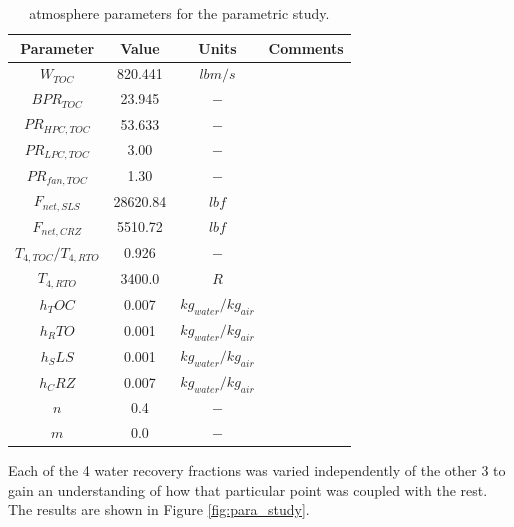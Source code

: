 \documentclass[12pt]{article}
\begin{document}
\begin{table}[H]
    \centering
    \caption{atmosphere parameters for the parametric study.}
    \begin{tabular}{|c|c|c|c|}
        \hline
        Parameter             & Value    & Units                 & Comments \\
        \hline
        $W_{TOC}$             & 820.441  & $lbm/s$               &          \\
        $BPR_{TOC}$           & 23.945   & $-$                   &          \\
        $PR_{HPC,TOC}$        & 53.633   & $-$                   &          \\
        $PR_{LPC,TOC}$        & 3.00     & $-$                   &          \\
        $PR_{fan,TOC}$        & 1.30     & $-$                   &          \\
        $F_{net,SLS}$         & 28620.84 & $lbf$                 &          \\
        $F_{net,CRZ}$         & 5510.72  & $lbf$                 &          \\
        $T_{4,TOC}/T_{4,RTO}$ & 0.926    & $-$                   &          \\
        $T_{4,RTO}$           & 3400.0   & $R$                   &          \\
        $h_TOC$               & 0.007    & $kg_{water}/kg_{air}$ &          \\
        $h_RTO$               & 0.001    & $kg_{water}/kg_{air}$ &          \\
        $h_SLS$               & 0.001    & $kg_{water}/kg_{air}$ &          \\
        $h_CRZ$               & 0.007    & $kg_{water}/kg_{air}$ &          \\
        $n$                   & 0.4      & $-$                   &          \\
        $m$                   & 0.0      & $-$                   &          \\
        \hline
    \end{tabular}
    \label{hx_params}
\end{table}

\noindent
Each of the 4 water recovery fractions was varied independently of the other 3 to gain an understanding of how that particular point was coupled with the rest.
The results are shown in Figure \ref{fig:para_study}.
\end{document}
